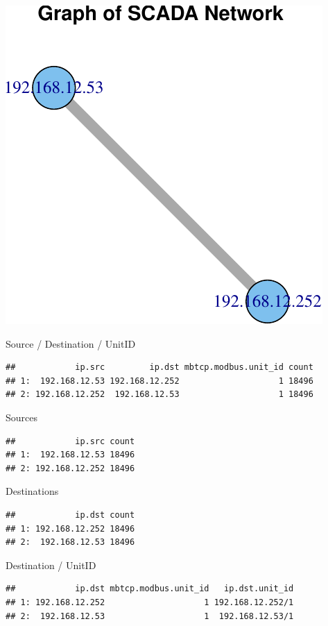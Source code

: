 \documentclass[]{article}
\begin{document}
\begin{center}\includegraphics{sew_files/figure-latex/warning-1} \end{center}

Source / Destination / UnitID

\begin{verbatim}
##            ip.src         ip.dst mbtcp.modbus.unit_id count
## 1:  192.168.12.53 192.168.12.252                    1 18496
## 2: 192.168.12.252  192.168.12.53                    1 18496
\end{verbatim}

Sources

\begin{verbatim}
##            ip.src count
## 1:  192.168.12.53 18496
## 2: 192.168.12.252 18496
\end{verbatim}

Destinations

\begin{verbatim}
##            ip.dst count
## 1: 192.168.12.252 18496
## 2:  192.168.12.53 18496
\end{verbatim}

Destination / UnitID

\begin{verbatim}
##            ip.dst mbtcp.modbus.unit_id   ip.dst.unit_id
## 1: 192.168.12.252                    1 192.168.12.252/1
## 2:  192.168.12.53                    1  192.168.12.53/1
\end{verbatim}
\end{document}
